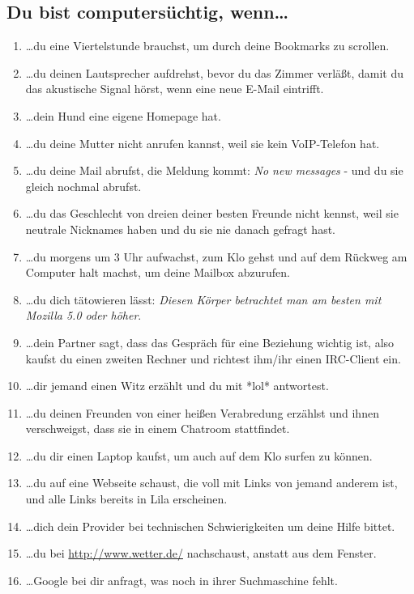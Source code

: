 \subsection*{\Large{Du bist computersüchtig, wenn\ldots}}

\begin{enumerate}
\item \ldots du eine Viertelstunde brauchst, um durch deine Bookmarks zu scrollen.
\item \ldots du deinen Lautsprecher aufdrehst, bevor du das Zimmer verläßt, damit du das akustische Signal hörst, wenn eine neue E-Mail eintrifft.
\item \ldots dein Hund eine eigene Homepage hat.
\item \ldots du deine Mutter nicht anrufen kannst, weil sie kein VoIP-Telefon hat.
\item \ldots du deine Mail abrufst, die Meldung kommt: \emph{No new messages} - und du sie gleich nochmal abrufst.
\item \ldots du das Geschlecht von dreien deiner besten Freunde nicht kennst, weil sie neutrale Nicknames haben und du sie nie danach gefragt hast.
\item \ldots du morgens um 3 Uhr aufwachst, zum Klo gehst und auf dem Rückweg am Computer halt machst, um deine Mailbox abzurufen.
\item \ldots du dich tätowieren lässt: \emph{Diesen Körper betrachtet man am besten mit Mozilla 5.0 oder höher}.
\item \ldots dein Partner sagt, dass das Gespräch für eine Beziehung wichtig ist, also kaufst du einen zweiten Rechner und richtest ihm/ihr einen IRC-Client ein.
\item \ldots dir jemand einen Witz erzählt und du mit *lol* antwortest.
\item \ldots du deinen Freunden von einer heißen Verabredung erzählst und ihnen verschweigst, dass sie in einem Chatroom stattfindet.
\item \ldots du dir einen Laptop kaufst, um auch auf dem Klo surfen zu können.
\item \ldots du auf eine Webseite schaust, die voll mit Links von jemand anderem ist, und alle Links bereits in Lila erscheinen.
\item \ldots dich dein Provider bei technischen Schwierigkeiten um deine Hilfe bittet.
\item \ldots du bei \url{http://www.wetter.de/} nachschaust, anstatt aus dem Fenster.
\item \ldots Google bei dir anfragt, was noch in ihrer Suchmaschine fehlt.

\end{enumerate}
